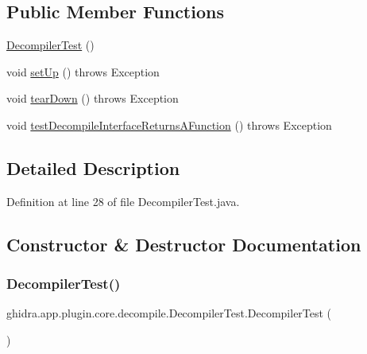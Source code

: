 \subsection*{Public Member Functions}
\begin{DoxyCompactItemize}
\item 
\mbox{\hyperlink{classghidra_1_1app_1_1plugin_1_1core_1_1decompile_1_1_decompiler_test_ab0a49b92d1927b358b219c96ee6c0d7d}{Decompiler\+Test}} ()
\item 
void \mbox{\hyperlink{classghidra_1_1app_1_1plugin_1_1core_1_1decompile_1_1_decompiler_test_a0211fca547edaed4d135de9ec057fbe5}{set\+Up}} ()  throws Exception 
\item 
void \mbox{\hyperlink{classghidra_1_1app_1_1plugin_1_1core_1_1decompile_1_1_decompiler_test_a11c079ee5a5d789090c379cf60347130}{tear\+Down}} ()  throws Exception 
\item 
void \mbox{\hyperlink{classghidra_1_1app_1_1plugin_1_1core_1_1decompile_1_1_decompiler_test_a92c99e52e7f581f731f5d23aded7c15b}{test\+Decompile\+Interface\+Returns\+A\+Function}} ()  throws Exception 
\end{DoxyCompactItemize}


\subsection{Detailed Description}


Definition at line 28 of file Decompiler\+Test.\+java.



\subsection{Constructor \& Destructor Documentation}
\mbox{\label{classghidra_1_1app_1_1plugin_1_1core_1_1decompile_1_1_decompiler_test_ab0a49b92d1927b358b219c96ee6c0d7d}} 
\subsubsection{\texorpdfstring{DecompilerTest()}{DecompilerTest()}}
{\footnotesize\ttfamily ghidra.\+app.\+plugin.\+core.\+decompile.\+Decompiler\+Test.\+Decompiler\+Test (\begin{DoxyParamCaption}{ }\end{DoxyParamCaption})\hspace{0.3cm}{\ttfamily [inline]}}



